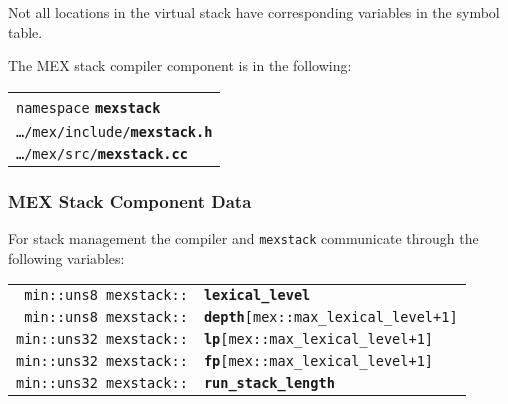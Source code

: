 \documentclass[12pt]{article}
\makeatletter
\newcommand{\TT}[1]{{\tt \bfseries #1}}
\newcommand{\ttkey}[1]{\TT{#1}\index{#1@{\tt #1}}}
\newcommand{\ttindex}[1]{\index{#1@{\tt #1}}}
\newenvironment{indpar}[1][0.3in]%
	{\begin{list}{}%
		     {\setlength{\itemsep}{0in}%
		      \setlength{\topsep}{0in}%
		      \setlength{\parsep}{1ex}%
		      \setlength{\labelwidth}{#1}%
		      \setlength{\leftmargin}{#1}%
		      \addtolength{\leftmargin}{\labelsep}}%
	 \item}%
	{\end{list}}
\newcommand{\MEXSTACKKEY}[1]%
	   {\TT{#1}\ttindex{mexstack::#1}\ttindex{#1}}
\makeatother
\begin{document}
Not all locations in the virtual stack have corresponding variables
in the symbol table.

The MEX stack compiler component is in the following:

\begin{indpar}
\begin{tabular}{l}
{\tt namespace} \ttkey{mexstack}
\\
{\tt \ldots/mex/include/}\ttkey{mexstack.h}
\\
{\tt \ldots/mex/src/}\ttkey{mexstack.cc}
\end{tabular}
\end{indpar}

\subsubsection{MEX Stack Component Data}
\label{MEX-STACK-COMPONENT-DATA}

For stack management the compiler and {\tt mexstack}
communicate through the following variables:

\begin{tabular}{@{}r@{~~~}l}
\verb|min::uns8 mexstack::| & \MEXSTACKKEY{lexical\_level} \\
\verb|min::uns8 mexstack::| &
    \MEXSTACKKEY{depth}\verb|[mex::max_lexical_level+1]| \\
\verb|min::uns32 mexstack::| &
    \MEXSTACKKEY{lp}\verb|[mex::max_lexical_level+1]| \\
\verb|min::uns32 mexstack::| &
    \MEXSTACKKEY{fp}\verb|[mex::max_lexical_level+1]| \\
\verb|min::uns32 mexstack::| & \MEXSTACKKEY{run\_stack\_length} \\
\end{tabular}
\end{document}
